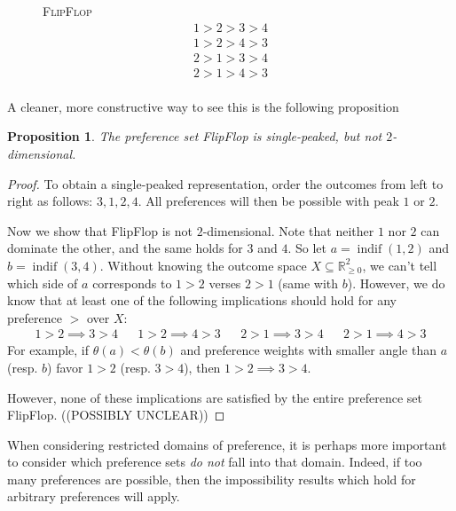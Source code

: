 \documentclass[12pt]{article}
\newtheorem{proposition}[theorem]{Proposition}
\newcommand{\Rgz}{\mathbb{R}_{\ge 0}}
\DeclareMathOperator*{\indif}{indif}
\newcommand{\1}[1]{\mathds{1}[{#1}]}
\begin{document}
  \begin{figure}
    \centering
    {\textsc{FlipFlop}}
    \begin{align*}
      1 > 2 > 3 > 4 \\
      1 > 2 > 4 > 3 \\
      2 > 1 > 3 > 4 \\
      2 > 1 > 4 > 3 \\
    \end{align*}
    \vspace{-1in}
  \end{figure}

  A cleaner, more constructive way to see this is the following proposition
  \begin{proposition}
    The preference set {\sc FlipFlop} is single-peaked, but not
    $2$-dimensional.
  \end{proposition}
  \begin{proof}
    To obtain a single-peaked representation, order the outcomes
    from left to right as follows: $3,1,2,4$.
    All preferences will then be possible with peak $1$ or $2$.

    Now we show that {\sc FlipFlop} is not $2$-dimensional.
    Note that neither $1$ nor $2$ can dominate the other,
    and the same holds for $3$ and $4$.
    So let $a=\indif(1,2)$ and $b=\indif(3,4)$.
    Without knowing the outcome space $X\subseteq \Rgz^2$,
    we can't tell which side of $a$ corresponds to $1 > 2$
    verses $2 > 1$ (same with $b$).
    However, we do know that at least one of the following implications should
    hold for any preference $>$ over $X$:
    \begin{align*}
      1 > 2 \implies 3 > 4
      && 1 > 2 \implies 4 > 3 &&
      2 > 1 \implies 3 > 4
      && 2 > 1 \implies 4 > 3
    \end{align*}
    For example, if $\theta(a) < \theta(b)$ and preference weights with smaller
    angle than $a$ (resp. $b$) favor $1 > 2$ (resp. $3 > 4$),
    then $1 > 2 \implies 3 > 4$.

    However, none of these implications are satisfied by the entire preference
    set {\sc FlipFlop}.
    ((POSSIBLY UNCLEAR))
  \end{proof}

  When considering restricted domains of preference, it is perhaps more
  important to consider which preference sets \emph{do not} fall into that
  domain. Indeed, if too many preferences are possible, then the impossibility
  results which hold for arbitrary preferences will apply.
\end{document}
